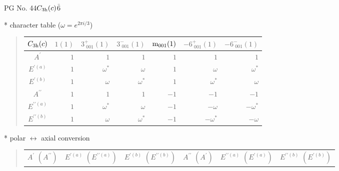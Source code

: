 \documentclass[fleqn,8pt,landscape]{jsarticle}
\begin{document}
\setcounter{MaxMatrixCols}{32}

\renewcommand{\tablename}{Table~}
\renewcommand{\figurename}{Figure~}
\begin{center}
\LARGE
PG No. 44\quad$C_{\rm 3h}(c)$\quad$\bar{6}$\quad[ hexagonal ]
\end{center}

* character table ($\omega=e^{2\pi i/3}$)
\begin{quote}
\begin{tabular}{crrrrrr} \hline \hline
$ C_{\rm 3h}(c) $ & $ 1(1) $ & $ 3^{+}_{\,\,001}(1) $ & $ 3^{-}_{\,\,001}(1) $ & $ {\rm m}_{001}(1) $ & $ -6^{+}_{\,\,001}(1) $ & $ -6^{-}_{\,\,001}(1) $ \\ \hline
$ A^{\prime} $ & $ 1 $ & $ 1 $ & $ 1 $ & $ 1 $ & $ 1 $ & $ 1 $ \\
$ E^{\prime(a)} $ & $ 1 $ & $ \omega^{*} $ & $ \omega $ & $ 1 $ & $ \omega $ & $ \omega^{*} $ \\
$ E^{\prime(b)} $ & $ 1 $ & $ \omega $ & $ \omega^{*} $ & $ 1 $ & $ \omega^{*} $ & $ \omega $ \\
$ A^{\prime\prime} $ & $ 1 $ & $ 1 $ & $ 1 $ & $ -1 $ & $ -1 $ & $ -1 $ \\
$ E^{\prime\prime(a)} $ & $ 1 $ & $ \omega^{*} $ & $ \omega $ & $ -1 $ & $ - \omega $ & $ - \omega^{*} $ \\
$ E^{\prime\prime(b)} $ & $ 1 $ & $ \omega $ & $ \omega^{*} $ & $ -1 $ & $ - \omega^{*} $ & $ - \omega $ \\
 \hline \hline
\end{tabular}
\end{quote}

* polar $\leftrightarrow$ axial conversion
\begin{quote}
\begin{tabular}{cccccc}
$ A^{\prime}\,\,(A^{\prime\prime}) $ & $ E^{\prime(a)}\,\,(E^{\prime\prime(a)}) $ & $ E^{\prime(b)}\,\,(E^{\prime\prime(b)}) $ & $ A^{\prime\prime}\,\,(A^{\prime}) $ & $ E^{\prime\prime(a)}\,\,(E^{\prime(a)}) $ & $ E^{\prime\prime(b)}\,\,(E^{\prime(b)}) $
\end{tabular}
\end{quote}
\end{document}
